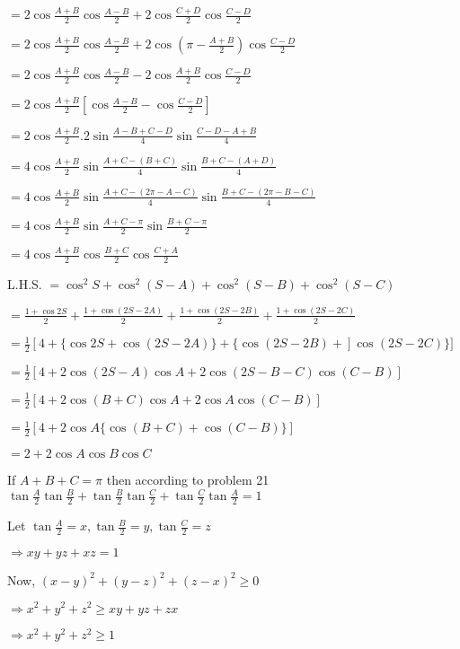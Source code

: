   $= 2\cos\frac{A + B}{2}\cos\frac{A - B}{2} + 2\cos\frac{C + D}{2}\cos\frac{C - D}{2}$

  $= 2\cos\frac{A + B}{2}\cos\frac{A - B}{2} + 2\cos\left(\pi - \frac{A + B}{2}\right)\cos\frac{C - D}{2}$

  $= 2\cos\frac{A + B}{2}\cos\frac{A - B}{2} - 2\cos\frac{A + B}{2}\cos\frac{C - D}{2}$

  $= 2\cos\frac{A + B}{2}\left[\cos\frac{A - B}{2} - \cos\frac{C - D}{2}\right]$

  $= 2\cos\frac{A + B}{2}.2\sin\frac{A - B + C - D}{4}\sin\frac{C - D - A + B}{4}$

  $= 4\cos\frac{A + B}{2}\sin\frac{A + C - (B + C)}{4}\sin\frac{B + C - (A + D)}{4}$

  $= 4\cos\frac{A + B}{2}\sin\frac{A + C -(2\pi - A - C)}{4}\sin\frac{B + C - (2\pi - B - C)}{4}$

  $= 4\cos\frac{A + B}{2}\sin\frac{A + C - \pi}{2}\sin\frac{B + C - \pi}{2}$

  $= 4\cos\frac{A + B}{2}\cos\frac{B + C}{2}\cos\frac{C + A}{2}$

\item L.H.S. $= \cos^2S + \cos^2(S - A) + \cos^2(S - B) + \cos^2(S - C)$

  $= \frac{1 + \cos 2S}{2} + \frac{1 + \cos(2S - 2A)}{2} + \frac{1 + \cos(2S - 2B)}{2} + \frac{1 + \cos(2S - 2C)}{2}$

  $= \frac{1}{2}[4 + \{\cos2S + \cos(2S - 2A)\} + \{\cos(2S - 2B) + ]\cos(2S - 2C)\}]$

  $= \frac{1}{2}[4 + 2\cos(2S - A)\cos A + 2\cos(2S - B - C)\cos(C - B)]$

  $= \frac{1}{2}[4 + 2\cos(B + C)\cos A + 2\cos A\cos(C - B)]$

  $= \frac{1}{2}[4 + 2\cos A\{\cos(B + C) + \cos(C - B)\}]$

  $= 2 + 2\cos A\cos B\cos C$

\item If $A + B + C = \pi$ then according to problem 21 $\tan\frac{A}{2}\tan\frac{B}{2} +
  \tan\frac{B}{2}\tan\frac{C}{2} + \tan\frac{C}{2}\tan\frac{A}{2} = 1$

  Let $\tan\frac{A}{2} = x, \tan\frac{B}{2} = y, \tan\frac{C}{2} = z$

  $\Rightarrow xy + yz + xz = 1$

  Now, $(x - y)^2 + (y - z)^2 + (z - x)^2 \geq 0$

  $\Rightarrow x^2 + y^2 + z^2 \geq xy + yz + zx$

  $\Rightarrow x^2 + y^2 + z^2 \geq 1$

